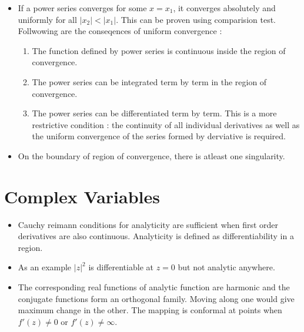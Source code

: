 \documentclass{report}
\begin{document}
\begin{itemize}

  \item If a power series converges for some $x=x_1$, it converges absolutely and uniformly for all $|x_2| < |x_1|$. This can be proven using comparision test.\\

    Follwowing are the conseqences of uniform convergence :

    \begin{enumerate}
      \item The function defined by power series is continuous inside the region of convergence. 

      \item The power series can be integrated term by term in the region of convergence.

      \item The power series can be differentiated term by term. This is a more restrictive condition : the continuity of all individual derivatives as well as  the uniform convergence of the series formed by derviative is required.

    \end{enumerate}

  \item On the boundary of region of convergence, there is atleast one singularity.

\end{itemize}

\chapter{Complex Variables}

\begin{itemize}

  \item Cauchy reimann conditions for analyticity are sufficient when first order derivatives are also continuous. Analyticity is defined as differentiability in a region. 

  \item As an example $|z|^2$ is differentiable at $z=0$ but not analytic anywhere.

  \item The corresponding real functions of analytic function are harmonic and the conjugate functions form an orthogonal family. Moving along one would give maximum change in the other. The mapping is conformal at points when $f'(z) \neq 0$ or $f'(z) \neq \infty$.

\end{itemize}
\end{document}
